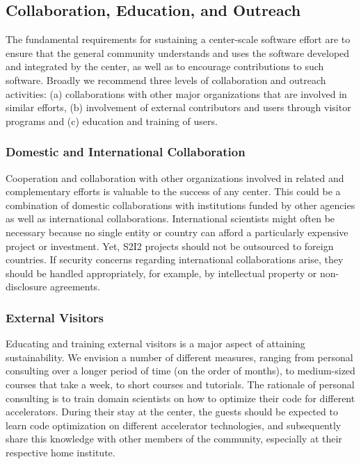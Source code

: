 \subsection{Collaboration, Education, and Outreach}
%


The fundamental requirements for sustaining a center-scale software effort are to ensure that the general community understands and uses the software developed and integrated by the center, as well as to encourage contributions to such software. Broadly we recommend three levels of collaboration and outreach activities: (a) collaborations with other major organizations that are involved in similar efforts, (b) involvement of external contributors and users through visitor programs and (c) education and training of users.

\subsubsection{Domestic and International Collaboration}
Cooperation and collaboration with other organizations involved in related and complementary efforts is valuable to the success of any center. This could be a combination of domestic collaborations with institutions funded by other agencies as well as international collaborations. International scientists might often be necessary because no single entity or country can afford a particularly expensive project or investment. Yet, S2I2 projects should not be outsourced to foreign countries. If security concerns regarding international collaborations arise, they should be handled appropriately, for example, by intellectual property or non-disclosure agreements.

\subsubsection{External Visitors}
Educating and training external visitors is a major aspect of attaining sustainability. We envision a number of different measures, ranging from personal consulting over a longer period of time (on the order of months), to medium-sized courses that take a week, to short courses and tutorials. The rationale of personal consulting is to train domain scientists on how to optimize their code for different accelerators. During their stay at the center, the guests should be expected to learn code optimization on different accelerator technologies, and subsequently share this knowledge with other members of the community, especially at their respective home institute.

